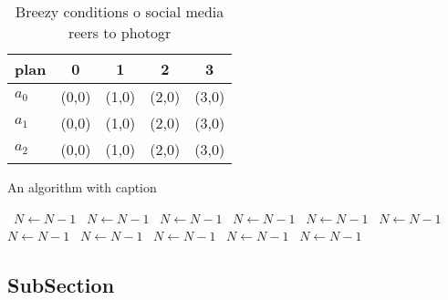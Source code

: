 \documentclass[a4paper]{article}
\begin{document}
\begin{table}
\begin{adjustbox}{width=0.6\columnwidth}
\begin{tabular}{|l|l|l|l|l|}
\hline
\textbf{plan} & \multicolumn{1}{c|}{\textbf{0}} & \multicolumn{1}{c|}{\textbf{1}} & \multicolumn{1}{c|}{\textbf{2}} & \multicolumn{1}{c|}{\textbf{3}} \\ \hline
\textbf{$a_0$}  & (0,0) & (1,0) & (2,0) & (3,0) \\ \hline
\textbf{$a_1$}  & (0,0) & (1,0) & (2,0) & (3,0) \\ \hline
\textbf{$a_2$}  & (0,0) & (1,0) & (2,0) & (3,0) \\ \hline
\end{tabular}
\end{adjustbox}
\caption{Breezy conditions o social media reers to photogr
}
\end{table}

\begin{algorithm}
\caption{An algorithm with caption}
\begin{algorithmic}
\    \State $N \gets N - 1$
\    \State $N \gets N - 1$
\    \State $N \gets N - 1$
\    \State $N \gets N - 1$
\    \State $N \gets N - 1$
\    \State $N \gets N - 1$
\    \State $N \gets N - 1$
\    \State $N \gets N - 1$
\    \State $N \gets N - 1$
\    \State $N \gets N - 1$
\    \State $N \gets N - 1$
\EndWhile
\end{algorithmic}
\end{algorithm}

\subsection{SubSection}
\end{document}
